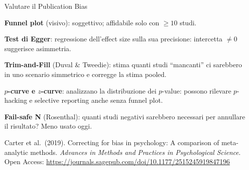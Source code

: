 \documentclass[
  ignorenonframetext,
]{beamer}
\begin{document}
\begin{frame}{Valutare il Publication Bias}
\label{valutare-il-publication-bias}
\small

\textbf{Funnel plot} (visivo): soggettivo; affidabile solo con
\(\geq 10\) studi.

\vspace{0.3em}

\textbf{Test di Egger}: regressione dell'effect size sulla sua
precisione: intercetta \(\neq 0\) suggerisce asimmetria.

\vspace{0.3em}

\textbf{Trim-and-Fill} (Duval \& Tweedie): stima quanti studi
``mancanti'' ci sarebbero in uno scenario simmetrico e corregge la stima
pooled.

\vspace{0.3em}

\textbf{\(p\)-curve e \(z\)-curve}: analizzano la distribuzione dei
\(p\)-value: possono rilevare \(p\)-hacking e selective reporting anche
senza funnel plot.

\vspace{0.3em}

\textbf{Fail-safe N} (Rosenthal): quanti studi negativi sarebbero
necessari per annullare il risultato? Meno usato oggi.

\vspace{0.2em}

\tiny Carter et al.~(2019). Correcting for bias in psychology: A
comparison of meta-analytic methods.
\emph{Advances in Methods and Practices in Psychological Science}. Open
Access: \url{https://journals.sagepub.com/doi/10.1177/2515245919847196}
\end{frame}
\end{document}

